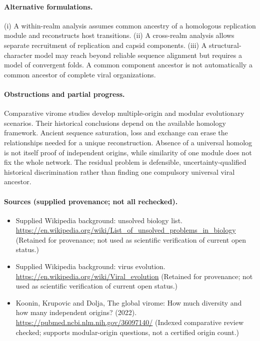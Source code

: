 \documentclass[11pt]{article}
\begin{document}
\paragraph{Alternative formulations.} (i) A within-realm analysis assumes common ancestry of a homologous replication module and reconstructs host transitions. (ii) A cross-realm analysis allows separate recruitment of replication and capsid components. (iii) A structural-character model may reach beyond reliable sequence alignment but requires a model of convergent folds. A common component ancestor is not automatically a common ancestor of complete viral organizations.

\paragraph{Obstructions and partial progress.} Comparative virome studies develop multiple-origin and modular evolutionary scenarios. Their historical conclusions depend on the available homology framework. Ancient sequence saturation, loss and exchange can erase the relationships needed for a unique reconstruction. Absence of a universal homolog is not itself proof of independent origins, while similarity of one module does not fix the whole network. The residual problem is defensible, uncertainty-qualified historical discrimination rather than finding one compulsory universal viral ancestor.

\paragraph{Sources (supplied provenance; not all rechecked).} \begin{itemize}
\item Supplied Wikipedia background: unsolved biology list. \url{https://en.wikipedia.org/wiki/List_of_unsolved_problems_in_biology} (Retained for provenance; not used as scientific verification of current open status.)
\item Supplied Wikipedia background: virus evolution. \url{https://en.wikipedia.org/wiki/Viral_evolution} (Retained for provenance; not used as scientific verification of current open status.)
\item Koonin, Krupovic and Dolja, The global virome: How much diversity and how many independent origins? (2022). \url{https://pubmed.ncbi.nlm.nih.gov/36097140/} (Indexed comparative review checked; supports modular-origin questions, not a certified origin count.)
\end{itemize}
\end{document}
